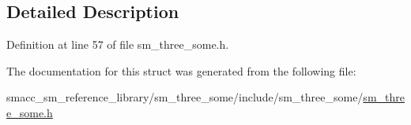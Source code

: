 \subsection{Detailed Description}


Definition at line 57 of file sm\+\_\+three\+\_\+some.\+h.



The documentation for this struct was generated from the following file\+:\begin{DoxyCompactItemize}
\item 
smacc\+\_\+sm\+\_\+reference\+\_\+library/sm\+\_\+three\+\_\+some/include/sm\+\_\+three\+\_\+some/\hyperlink{sm__three__some_8h}{sm\+\_\+three\+\_\+some.\+h}\end{DoxyCompactItemize}

